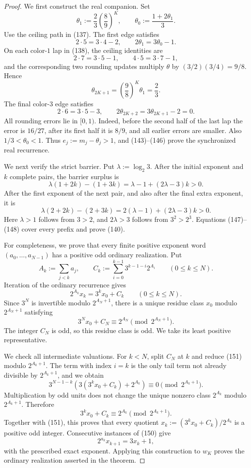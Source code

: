 \documentclass[11pt]{article}
\begin{document}
\begin{proof}
We first construct the real companion.  Set
\[
  \theta_1:=\frac23\left(\frac89\right)^K,
  \qquad
  \theta_0:=\frac{1+2\theta_1}{3}.
\tag{142}
\]
Use the ceiling path in (137).  The first edge satisfies
\[
  2\cdot5=3\cdot4-2,
  \qquad
  2\theta_1=3\theta_0-1.
\tag{143}
\]
On each color-$1$ lap in (138), the ceiling identities are
\[
  2\cdot7=3\cdot5-1,
  \qquad
  4\cdot5=3\cdot7-1,
\tag{144}
\]
and the corresponding two rounding updates multiply $\theta$ by
$(3/2)(3/4)=9/8$.  Hence
\[
  \theta_{2K+1}=\left(\frac98\right)^K\theta_1=\frac23.
\tag{145}
\]
The final color-$3$ edge satisfies
\[
  2\cdot6=3\cdot5-3,
  \qquad
  2\theta_{2K+2}=3\theta_{2K+1}-2=0.
\tag{146}
\]
All rounding errors lie in $[0,1)$.  Indeed, before the second half of the
last lap the error is $16/27$, after its first half it is $8/9$, and all
earlier errors are smaller.  Also $1/3<\theta_0<1$.  Thus
$e_j:=m_j-\theta_j>1$, and (143)--(146) prove the synchronized real
recurrence.

We next verify the strict barrier.  Put $\lambda:=\log_2 3$.  After the
initial exponent and $k$ complete pairs, the barrier surplus is
\[
  \lambda(1+2k)-(1+3k)
  =\lambda-1+(2\lambda-3)k>0.
\tag{147}
\]
After the first exponent of the next pair, and also after the final extra
exponent, it is
\[
  \lambda(2+2k)-(2+3k)
  =2(\lambda-1)+(2\lambda-3)k>0.
\tag{148}
\]
Here $\lambda>1$ follows from $3>2$, and $2\lambda>3$ follows from
$3^2>2^3$.  Equations (147)--(148) cover every prefix and prove (140).

For completeness, we prove that every finite positive exponent word
$(a_0,\ldots,a_{N-1})$ has a positive odd ordinary realization.  Put
\[
  A_k:=\sum_{j<k}a_j,
  \qquad
  C_k:=\sum_{i=0}^{k-1}3^{k-1-i}2^{A_i}
  \qquad(0\leq k\leq N).
\tag{149}
\]
Iteration of the ordinary recurrence gives
\[
  2^{A_k}x_k=3^kx_0+C_k
  \qquad(0\leq k\leq N).
\tag{150}
\]
Since $3^N$ is invertible modulo $2^{A_N+1}$, there is a unique residue
class $x_0$ modulo $2^{A_N+1}$ satisfying
\[
  3^Nx_0+C_N\equiv2^{A_N}\pmod{2^{A_N+1}}.
\tag{151}
\]
The integer $C_N$ is odd, so this residue class is odd.  We take its least
positive representative.

We check all intermediate valuations.  For $k<N$, split $C_N$ at $k$ and
reduce (151) modulo $2^{A_k+1}$.  The term with index $i=k$ is the only
tail term not already divisible by $2^{A_k+1}$, and we obtain
\[
  3^{N-1-k}
  \left(3(3^kx_0+C_k)+2^{A_k}\right)
  \equiv0\pmod{2^{A_k+1}}.
\tag{152}
\]
Multiplication by odd units does not change the unique nonzero class
$2^{A_k}$ modulo $2^{A_k+1}$.  Therefore
\[
  3^kx_0+C_k\equiv2^{A_k}\pmod{2^{A_k+1}}.
\tag{153}
\]
Together with (151), this proves that every quotient
$x_k:=(3^kx_0+C_k)/2^{A_k}$ is a positive odd integer.  Consecutive
instances of (150) give
\[
  2^{a_k}x_{k+1}=3x_k+1,
\]
with the prescribed exact exponent.  Applying this construction to $w_K$
proves the ordinary realization asserted in the theorem.


\end{proof}
\end{document}
